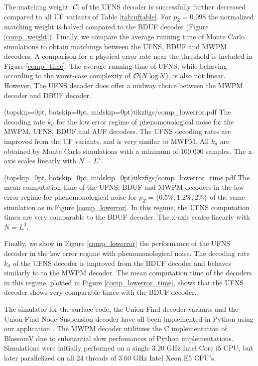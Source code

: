 The matching weight $\lvert\mathcal{C}\rvert$ of the UFNS decoder is successfully further decreased compared to all UF variants of Table \ref{tab:uftable}. For $p_Z = 0.098$ the normalized matching weight is halved compared to the BDUF decoder (Figure \ref{comp_weight}). Finally, we compare the average running time of Monte Carlo simulations to obtain matchings between the UFNS, BDUF and MWPM decoders. A comparison for a physical error rate near the threshold is included in Figure \ref{comp_time}. The average running time of UFNS, while behaving according to the worst-case complexity of $\mathcal{O}(N \log{N})$, is also not linear. However, The UFNS decoder does offer a midway choice between the MWPM decoder and DBUF decoder. 

\Figure[htb](topskip=0pt, botskip=0pt, midskip=0pt){tikzfigs/comp_lowerror.pdf}{
  The decoding rate $k_d$ for the low error regime of phenomonological noise for the MWPM, UFNS, BDUF and AUF decoders. The UFNS decoding rates are improved from the UF variants, and is very similar to MWPM. All $k_d$ are obtained by Monte Carlo simulations with a minimum of $100.000$ samples. The x-axis scales linearly with $N = L^3$.\label{comp_lowerror}}

\Figure[htb](topskip=0pt, botskip=0pt, midskip=0pt){tikzfigs/comp_lowerror_time.pdf}{
  The mean computation time of the UFNS, BDUF and MWPM decoders in the low error regime for phenomonological noise for $p_Z = \{0.5\%, 1.2\%, 2\%\}$ of the same simulation as in Figure \ref{comp_lowerror}. In this regime, the UFNS computation times are very comparable to the BDUF decoder. The x-axis scales linearly with $N = L^3$. \label{comp_lowerror_time}}

Finally, we show in Figure \ref{comp_lowerror} the performance of the UFNS decoder in the low error regime with phenomonological noise. The decoding rate $k_d$ of the UFNS decoder is improved from the BDUF decoder and behaves similarly to to the MWPM decoder. The mean computation time of the decoders in this regime, plotted in Figure \ref{comp_lowerror_time}, shows that the UFNS decoder shows very comparable times with the BDUF decoder.\par

The simulator for the surface code, the Union-Find decoder variants and the Union-Find Node-Suspension decoder have all been implemented in Python using our application \cite{OpenSurfaceSim}. The MWPM decoder utilitizes the C implementation of BlossomV \cite{kolmogorov2009blossom} due to substantial slow perfomances of Python implementations. Simulations were initially performed on a single 3.20 GHz Intel Core i5 CPU, but later parallelized on all 24 threads of 3.60 GHz Intel Xeon E5 CPU's. 